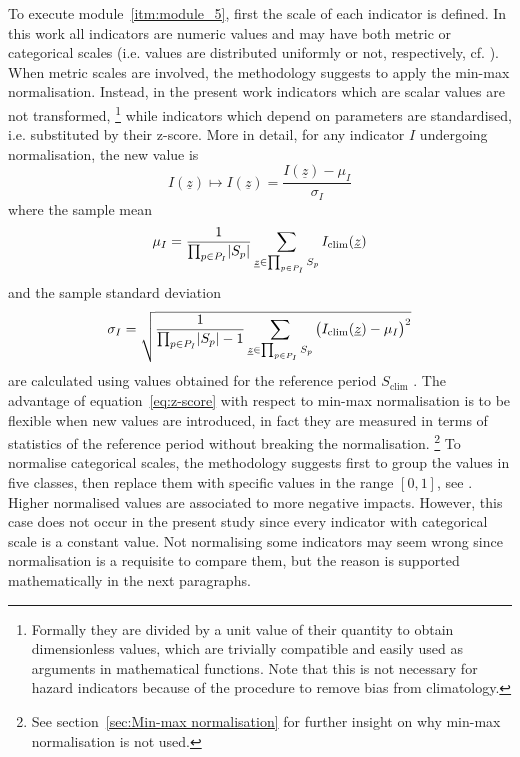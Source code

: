 To execute module~\ref{itm:module_5}, first the scale of each \gls{indicator} is defined. In this work all \glspl{indicator} are numeric values and may have both metric or categorical scales (i.e. values are distributed uniformly or not, respectively, cf. \cite[109]{2017GIZTheVulnerability}).
When metric scales are involved, the methodology suggests to apply the min-max normalisation. Instead, in the present work \glspl{indicator} which are scalar values are not transformed,%
\footnote{Formally they are divided by a unit value of their quantity to obtain dimensionless values, which are trivially compatible and easily used as arguments in mathematical functions. Note that this is not necessary for \gls{hazard} \glspl{indicator} because of the procedure to remove bias from climatology.}
while \glspl{indicator} which depend on parameters are standardised, i.e. substituted by their z-score. More in detail, for any \gls{indicator} $I$ undergoing normalisation, the new value is
\begin{equation}
  \label{eq:z-score}
  I(\underline{z}) \mapsto I(\underline{z}) = \frac{I(\underline{z}) - \mu_I}{\sigma_I}
\end{equation}
where the sample mean
\begin{equation}
  \label{eq:sample_mean}
  \mu_I = \frac{1}{\prod_{p \in P_I} \lvert S_p\rvert} \sum_{\underline{z} \in \prod_{p \in P_I} S_p} I_\text{clim}(\underline{z})
\end{equation}
and the sample standard deviation
\begin{equation}
  \label{eq:sample_standard_deviation}
  \sigma_I = \sqrt{\frac{1}{\prod_{p \in P_I} \lvert S_p\rvert - 1} \sum_{\underline{z} \in \prod_{p \in P_I} S_p} \big( I_\text{clim}(\underline{z}) - \mu_I \big)^2}
\end{equation}
are calculated using values obtained for the reference period $S_\text{clim}$ \cite[84]{2008OECDHandbookOn}. The advantage of equation~\eqref{eq:z-score} with respect to min-max normalisation is to be flexible when new values are introduced, in fact they are measured in terms of statistics of the reference period without breaking the normalisation.%
\footnote{See section~\ref{sec:Min-max normalisation} for further insight on why min-max normalisation is not used.}
To normalise categorical scales, the methodology suggests first to group the values in five classes, then replace them with specific values in the range $[0, 1]$, see \cite[115-116]{2017GIZTheVulnerability}. Higher normalised values are associated to more negative impacts. However, this case does not occur in the present study since every \gls{indicator} with categorical scale is a constant value. Not normalising some \glspl{indicator} may seem wrong since normalisation is a requisite to compare them, but the reason is supported mathematically in the next paragraphs.

